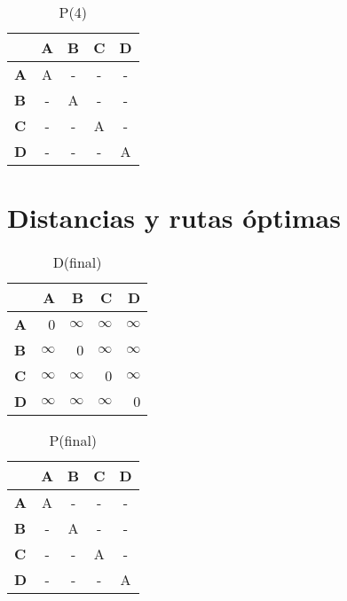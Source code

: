 \documentclass{article}
\newcommand{\INF}{$\infty$}
\begin{document}
\begin{table}[H]\centering
\caption{P(4)}
\begin{tabular}{l c c c c}
\toprule
 & \textbf{A} & \textbf{B} & \textbf{C} & \textbf{D}\\\midrule
\textbf{A} & A & - & - & - \\
\textbf{B} & - & A & - & - \\
\textbf{C} & - & - & A & - \\
\textbf{D} & - & - & - & A \\
\bottomrule
\end{tabular}
\end{table}

\section*{Distancias y rutas óptimas}
\begin{table}[H]\centering
\caption{D(final)}
\begin{tabular}{l r r r r}
\toprule
 & \textbf{A} & \textbf{B} & \textbf{C} & \textbf{D}\\\midrule
\textbf{A} & 0 & \INF & \INF & \INF \\
\textbf{B} & \INF & 0 & \INF & \INF \\
\textbf{C} & \INF & \INF & 0 & \INF \\
\textbf{D} & \INF & \INF & \INF & 0 \\
\bottomrule
\end{tabular}
\end{table}

\begin{table}[H]\centering
\caption{P(final)}
\begin{tabular}{l c c c c}
\toprule
 & \textbf{A} & \textbf{B} & \textbf{C} & \textbf{D}\\\midrule
\textbf{A} & A & - & - & - \\
\textbf{B} & - & A & - & - \\
\textbf{C} & - & - & A & - \\
\textbf{D} & - & - & - & A \\
\bottomrule
\end{tabular}
\end{table}
\end{document}
